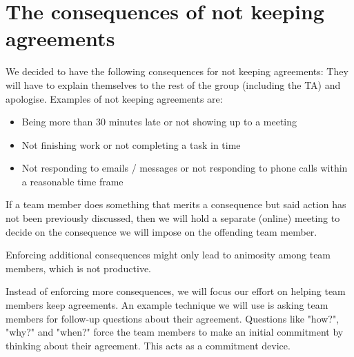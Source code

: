 \section{The consequences of not keeping agreements}

We decided to have the following consequences for not keeping agreements: They will have to explain themselves to the
rest of the group (including the TA) and apologise.
Examples of not keeping agreements are:
\begin{itemize}
  \item Being more than 30 minutes late or not showing up to a meeting
  \item Not finishing work or not completing a task in time
  \item Not responding to emails / messages or not responding to phone calls within a reasonable time frame
\end{itemize}

If a team member does something that merits a consequence but said action has not been previously discussed,
then we will hold a separate (online) meeting to decide on the consequence we will impose on the offending team member.

Enforcing additional consequences might only lead to animosity among team members,
which is not productive.

Instead of enforcing more consequences, we will focus our effort on helping team members keep agreements.
An example technique we will use is asking team members for follow-up questions about their agreement.
Questions like "how?", "why?" and "when?" force the team members to make an initial commitment by thinking about their agreement.
This acts as a commitment device.
